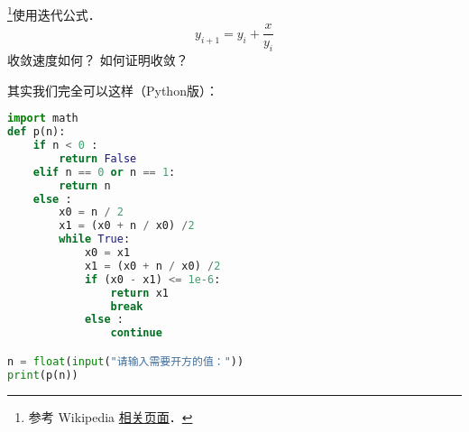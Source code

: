 
\begin{issues}
\issueDraft
\end{issues}

\footnote{参考 Wikipedia \href{https://en.wikipedia.org/wiki/Methods_of_computing_square_roots}{相关页面}．}使用迭代公式．
\begin{equation}
y_{i+1} = y_i + \frac{x}{y_i}
\end{equation}
收敛速度如何？ 如何证明收敛？

其实我们完全可以这样（Python版）：
\begin{lstlisting}[language=python]
import math
def p(n):
    if n < 0 :
        return False
    elif n == 0 or n == 1:
        return n
    else :
        x0 = n / 2
        x1 = (x0 + n / x0) /2
        while True:
            x0 = x1
            x1 = (x0 + n / x0) /2
            if (x0 - x1) <= 1e-6:
                return x1
                break
            else :
                continue

n = float(input("请输入需要开方的值："))
print(p(n))
\end{lstlisting}
